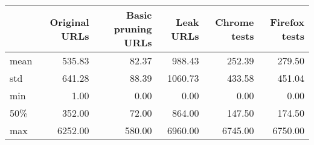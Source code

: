 \begin{tabular}{lrrrrr}
\toprule
{} &  Original URLs &  Basic pruning URLs &  Leak URLs &  Chrome tests &  Firefox tests \\
\midrule
mean &         535.83 &               82.37 &     988.43 &        252.39 &         279.50 \\
std  &         641.28 &               88.39 &    1060.73 &        433.58 &         451.04 \\
min  &           1.00 &                0.00 &       0.00 &          0.00 &           0.00 \\
50\% &         352.00 &               72.00 &     864.00 &        147.50 &         174.50 \\
max  &        6252.00 &              580.00 &    6960.00 &       6745.00 &        6750.00 \\
\bottomrule
\end{tabular}
